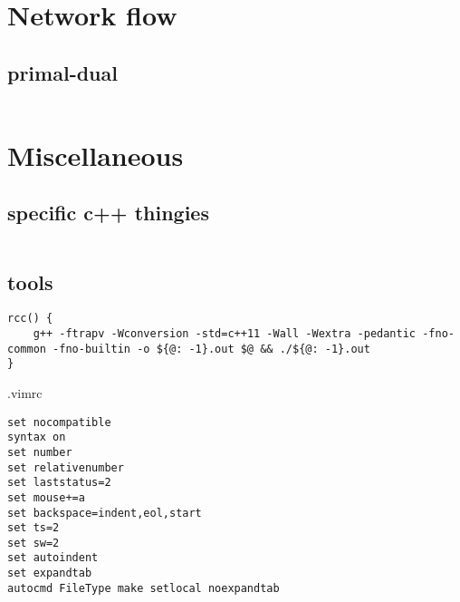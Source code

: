 \documentclass[portrait, 8pt, a4paper, oneside, landscape]{extarticle}
\begin{document}
\section{Network flow}
\subsection{primal-dual}
\inputminted{cpp}{src/primal_dual.cpp}

\section{Miscellaneous}
\subsection{specific c++ thingies}
\inputminted{cpp}{src/cpp_utils.cpp}

\subsection{tools}

\begin{verbatim}
rcc() {
    g++ -ftrapv -Wconversion -std=c++11 -Wall -Wextra -pedantic -fno-common -fno-builtin -o ${@: -1}.out $@ && ./${@: -1}.out
}
\end{verbatim}

.vimrc
\begin{verbatim}
set nocompatible
syntax on
set number
set relativenumber
set laststatus=2
set mouse+=a
set backspace=indent,eol,start
set ts=2
set sw=2
set autoindent
set expandtab
autocmd FileType make setlocal noexpandtab
\end{verbatim}

\inputminted{bash}{src/bash_util_cmds.sh}
\end{document}
